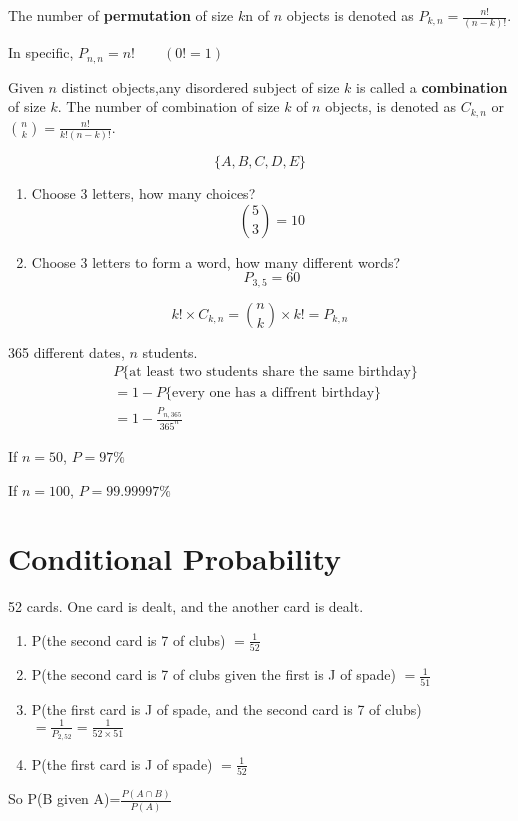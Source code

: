 \begin{defn}
The number of \textbf{permutation} of size $k$n of $n$ objects is denoted as $P_{k,n}=\frac{n!}{(n-k)!}$.

In specific, $P_{n,n}=n!\qquad (0!=1)$
\end{defn}

\begin{defn}
Given $n$ distinct objects,any disordered subject of size $k$ is called a \textbf{combination} of size $k$. The number of combination of size $k$ of $n$ objects, is denoted as $C_{k,n}$ or $\binom nk=\frac{n!}{k!(n-k)!}$.
\end{defn}


\begin{exmp}
\[\{A,B,C,D,E\}\]
\begin{enumerate}
\item  Choose 3 letters, how many choices?
\[\binom 53 =10\]
\item  Choose 3 letters to form a word, how many different words?
\[P_{3,5}=60\]
\end{enumerate}
\end{exmp}

\begin{prop}
\[k!\times C_{k,n}=\binom nk \times k!=P_{k,n}\]
\end{prop}

\begin{exmp} 
365 different dates, $n$ students.
\begin{align*}
&P\{\text{at least two students share the same birthday}\}\\
&=1-P\{\text{every one has a diffrent birthday}\}\\
&=1-\frac{P_{n,365}}{365^n}
\end{align*}

If $n=50$, $P=97\%$

If $n=100$, $P=99.99997\%$
\end{exmp}


\section{Conditional Probability}
\begin{exmp}
52 cards. One card is dealt, and the another card is dealt.
\begin{enumerate}
\item P(the second card is 7 of clubs)
$=\frac{1}{52}$
\item P(the second card is 7 of clubs given the first is J of spade)
$=\frac{1}{51}$
\item P(the first card is J of spade, and the second card is 7 of clubs)
$=\frac{1}{P_{2,52}}=\frac{1}{52\times 51}$
\item P(the first card is J of spade)
$=\frac{1}{52}$
\end{enumerate}

So P(B given A)=$\frac{P(A \cap B)}{P(A)}$
\end{exmp}

